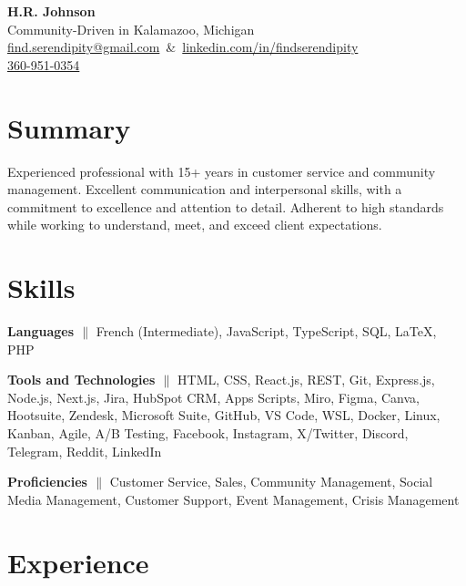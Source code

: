 \documentclass[a4paper,10pt]{article}
\begin{document}
\begin{center} %
      {\LARGE \textbf{H.R. Johnson}} \\
      Community-Driven in Kalamazoo, Michigan \\
      \mbox{\href{mailto:find.serendipity@gmail.com}{find.serendipity@gmail.com} \&
            \href{https://www.linkedin.com/in/findserendipity/}{linkedin.com/in/findserendipity}}\\
      \href{tel:360-951-0354}{360-951-0354}

\end{center}

\section{Summary }
\noindent
Experienced professional with 15+ years in customer service and community management. Excellent communication and interpersonal skills, with a commitment to excellence and attention to detail. Adherent to high standards while working to understand, meet, and exceed client expectations.

\section{Skills}
\textbf{Languages {$\parallel$}} \small{{ French (Intermediate),
            JavaScript, TypeScript, SQL, LaTeX, PHP}}

\textbf{Tools and Technologies {$\parallel$}} \small{{ HTML, CSS, React.js, REST, Git, Express.js, Node.js, Next.js, Jira, HubSpot CRM, Apps Scripts, Miro, Figma, Canva, Hootsuite, Zendesk, Microsoft Suite, 
            GitHub, VS Code, WSL, Docker, Linux, Kanban, Agile, A/B Testing, Facebook, Instagram, X/Twitter, Discord, Telegram, Reddit, LinkedIn}}

\textbf{Proficiencies {$\parallel$}} \small{{Customer Service, Sales, Community Management, Social Media Management, Customer Support, Event Management, Crisis Management}}

\section{Experience}
\end{document}
